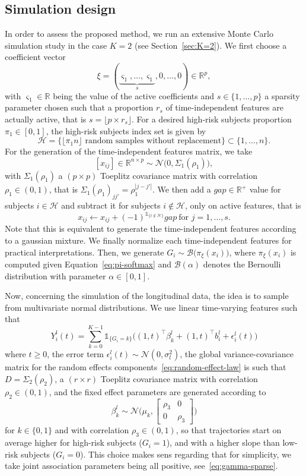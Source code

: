 \documentclass[11pt]{article}
\newcommand{\ind}[1]{\mathds{1}_{#1}}
\newcommand{\cN}{\mathcal N}
\newcommand{\cH}{\mathcal H}
\newcommand{\cB}{\mathcal B}
\newcommand{\R}{\mathds R}
\newcommand{\bSigma}{\textbf{$\Sigma$}}
\begin{document}
\subsection{Simulation design}
\label{simulation design}

In order to assess the proposed method, we run an extensive Monte Carlo simulation study in the case $K=2$ (see Section~\ref{sec:K=2}). We first choose a coefficient vector 
\begin{equation}
  \label{eq:xi-sparse}
  \xi = (\underbrace{\varsigma_1,\ldots,\varsigma_1}_s,0,\ldots,0) \in \R^p,
\end{equation} 
with $\varsigma_1\in\R$ being the value of the active coefficients and $s\in \{1,\dots,p\}$ a sparsity parameter chosen such that a proportion $r_s$ of time-independent features are actually active, that is $s = \lfloor p \times r_s \rfloor$. 
For a desired high-risk subjects proportion $\pi_1 \in [0,1]$, the high-risk subjects index set is given by
\[\cH = \big\{\lfloor \pi_1 n \rfloor \text{ random samples without replacement} \big\} \subset \{1, \ldots,n\}.\]
For the generation of the time-independent features matrix, we take 
\[ [x_{ij}] \in \R^{n \times p} \sim \cN \big(0, \bSigma_1(\rho_1)\big),\] 
with $\bSigma_1(\rho_1)$ a $(p \times p)$ Toeplitz covariance matrix \citep{mukherjee1988some} with correlation $\rho_1 \in (0, 1)$, that is $\bSigma_1(\rho_1)_{jj'} = \rho_1^{|j - j'|}$. 
We then add a $gap \in \R^+$ value for subjects $i \in \cH$ and subtract it for subjects $i \notin \cH$, only on active features, that is
\[x_{ij} \leftarrow x_{ij} + (-1)^{\ind{\{i \notin \cH\}}} gap\ \text{for } j = 1, \dots, s.\]
Note that this is equivalent to generate the time-independent features according to a gaussian mixture. We finally normalize each time-independent features for practical interpretations.
Then, we generate $G_i \sim \cB\big(\pi_\xi(x_i)\big)$, where $\pi_\xi(x_i)$ is computed given Equation~\eqref{eq:pi-softmax} and $\cB(\alpha)$ denotes the Bernoulli distribution with parameter $\alpha \in [0,1]$.

Now, concerning the simulation of the longitudinal data, the idea is to sample from multivariate normal distributions. 
We use linear time-varying features such that
\[ Y_i^l(t) = \sum_{k=0}^{K-1} \ind{\{G_i=k\}} \big( (1, t)^\top \beta_k^l + (1, t)^\top b_i^l + \epsilon_i^l(t) \big) \]
where $t \geq 0$, the error term $\epsilon_i^l(t) \sim \cN(0, \sigma_l^2)$, the global variance-covariance matrix for the random effects components~\eqref{eq:random-effect-law} is such that $D = \bSigma_2(\rho_2)$, a $(r \times r)$ Toeplitz covariance matrix with correlation $\rho_2 \in (0, 1)$, and the fixed effect parameters are generated according to 
\[ \beta_k^l \sim \cN\Big( 
\mu_k, 
\begin{bmatrix}
  \rho_3 & 0\\
  0 & \rho_3
\end{bmatrix} 
\Big) \]
for $k \in \{0, 1\}$ and with correlation $\rho_3 \in (0, 1)$, so that trajectories start on average higher for high-risk subjects ($G_i=1$), and with a higher slope than low-risk subjects ($G_i=0$). This choice makes sens regarding that for simplicity, we take joint association parameters being all positive, see~\eqref{eq:gamma-sparse}.
\end{document}
